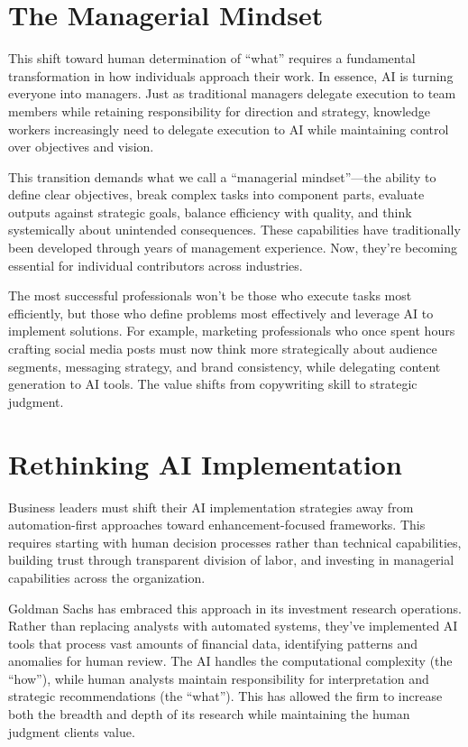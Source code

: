 \documentclass[
  Letterpaper,
]{scrbook}
\begin{document}
\section{The Managerial Mindset}\label{the-managerial-mindset}

This shift toward human determination of ``what'' requires a fundamental
transformation in how individuals approach their work. In essence, AI is
turning everyone into managers. Just as traditional managers delegate
execution to team members while retaining responsibility for direction
and strategy, knowledge workers increasingly need to delegate execution
to AI while maintaining control over objectives and vision.

This transition demands what we call a ``managerial mindset''---the
ability to define clear objectives, break complex tasks into component
parts, evaluate outputs against strategic goals, balance efficiency with
quality, and think systemically about unintended consequences. These
capabilities have traditionally been developed through years of
management experience. Now, they're becoming essential for individual
contributors across industries.

The most successful professionals won't be those who execute tasks most
efficiently, but those who define problems most effectively and leverage
AI to implement solutions. For example, marketing professionals who once
spent hours crafting social media posts must now think more
strategically about audience segments, messaging strategy, and brand
consistency, while delegating content generation to AI tools. The value
shifts from copywriting skill to strategic judgment.

\section{Rethinking AI
Implementation}\label{rethinking-ai-implementation}

Business leaders must shift their AI implementation strategies away from
automation-first approaches toward enhancement-focused frameworks. This
requires starting with human decision processes rather than technical
capabilities, building trust through transparent division of labor, and
investing in managerial capabilities across the organization.

Goldman Sachs has embraced this approach in its investment research
operations. Rather than replacing analysts with automated systems,
they've implemented AI tools that process vast amounts of financial
data, identifying patterns and anomalies for human review. The AI
handles the computational complexity (the ``how''), while human analysts
maintain responsibility for interpretation and strategic recommendations
(the ``what''). This has allowed the firm to increase both the breadth
and depth of its research while maintaining the human judgment clients
value.
\end{document}
